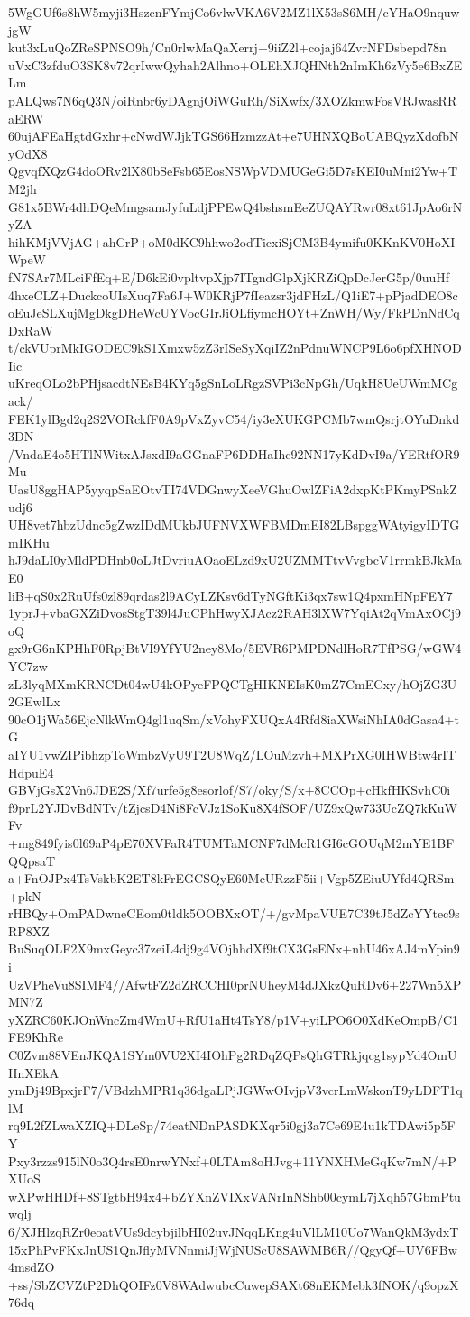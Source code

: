 5WgGUf6s8hW5myji3HszcnFYmjCo6vlwVKA6V2MZ1lX53sS6MH/cYHaO9nquwjgW
kut3xLuQoZReSPNSO9h/Cn0rlwMaQaXerrj+9iiZ2l+cojaj64ZvrNFDsbepd78n
uVxC3zfduO3SK8v72qrIwwQyhah2Alhno+OLEhXJQHNth2nImKh6zVy5e6BxZELm
pALQws7N6qQ3N/oiRnbr6yDAgnjOiWGuRh/SiXwfx/3XOZkmwFosVRJwasRRaERW
60ujAFEaHgtdGxhr+cNwdWJjkTGS66HzmzzAt+e7UHNXQBoUABQyzXdofbNyOdX8
QgvqfXQzG4doORv2lX80bSeFsb65EosNSWpVDMUGeGi5D7sKEI0uMni2Yw+TM2jh
G81x5BWr4dhDQeMmgsamJyfuLdjPPEwQ4bshsmEeZUQAYRwr08xt61JpAo6rNyZA
hihKMjVVjAG+ahCrP+oM0dKC9hhwo2odTicxiSjCM3B4ymifu0KKnKV0HoXIWpeW
fN7SAr7MLciFfEq+E/D6kEi0vpltvpXjp7ITgndGlpXjKRZiQpDcJerG5p/0uuHf
4hxeCLZ+DuckcoUIsXuq7Fa6J+W0KRjP7fIeazsr3jdFHzL/Q1iE7+pPjadDEO8c
oEuJeSLXujMgDkgDHeWcUYVocGIrJiOLfiymcHOYt+ZnWH/Wy/FkPDnNdCqDxRaW
t/ckVUprMkIGODEC9kS1Xmxw5zZ3rISeSyXqiIZ2nPdnuWNCP9L6o6pfXHNODIic
uKreqOLo2bPHjsacdtNEsB4KYq5gSnLoLRgzSVPi3cNpGh/UqkH8UeUWmMCgack/
FEK1ylBgd2q2S2VORckfF0A9pVxZyvC54/iy3eXUKGPCMb7wmQsrjtOYuDnkd3DN
/VndaE4o5HTlNWitxAJsxdI9aGGnaFP6DDHaIhc92NN17yKdDvI9a/YERtfOR9Mu
UasU8ggHAP5yyqpSaEOtvTI74VDGnwyXeeVGhuOwlZFiA2dxpKtPKmyPSnkZudj6
UH8vet7hbzUdnc5gZwzIDdMUkbJUFNVXWFBMDmEI82LBspggWAtyigyIDTGmIKHu
hJ9daLI0yMldPDHnb0oLJtDvriuAOaoELzd9xU2UZMMTtvVvgbcV1rrmkBJkMaE0
liB+qS0x2RuUfs0zl89qrdas2l9ACyLZKsv6dTyNGftKi3qx7sw1Q4pxmHNpFEY7
1yprJ+vbaGXZiDvosStgT39l4JuCPhHwyXJAcz2RAH3lXW7YqiAt2qVmAxOCj9oQ
gx9rG6nKPHhF0RpjBtVI9YfYU2ney8Mo/5EVR6PMPDNdlHoR7TfPSG/wGW4YC7zw
zL3lyqMXmKRNCDt04wU4kOPyeFPQCTgHIKNEIsK0mZ7CmECxy/hOjZG3U2GEwlLx
90cO1jWa56EjcNlkWmQ4gl1uqSm/xVohyFXUQxA4Rfd8iaXWsiNhIA0dGasa4+tG
aIYU1vwZIPibhzpToWmbzVyU9T2U8WqZ/LOuMzvh+MXPrXG0IHWBtw4rITHdpuE4
GBVjGsX2Vn6JDE2S/Xf7urfe5g8esorlof/S7/oky/S/x+8CCOp+cHkfHKSvhC0i
f9prL2YJDvBdNTv/tZjcsD4Ni8FcVJz1SoKu8X4fSOF/UZ9xQw733UcZQ7kKuWFv
+mg849fyis0l69aP4pE70XVFaR4TUMTaMCNF7dMcR1GI6cGOUqM2mYE1BFQQpsaT
a+FnOJPx4TsVskbK2ET8kFrEGCSQyE60McURzzF5ii+Vgp5ZEiuUYfd4QRSm+pkN
rHBQy+OmPADwneCEom0tldk5OOBXxOT/+/gvMpaVUE7C39tJ5dZcYYtec9sRP8XZ
BuSuqOLF2X9mxGeyc37zeiL4dj9g4VOjhhdXf9tCX3GsENx+nhU46xAJ4mYpin9i
UzVPheVu8SIMF4//AfwtFZ2dZRCCHI0prNUheyM4dJXkzQuRDv6+227Wn5XPMN7Z
yXZRC60KJOnWncZm4WmU+RfU1aHt4TsY8/p1V+yiLPO6O0XdKeOmpB/C1FE9KhRe
C0Zvm88VEnJKQA1SYm0VU2XI4IOhPg2RDqZQPsQhGTRkjqcg1sypYd4OmUHnXEkA
ymDj49BpxjrF7/VBdzhMPR1q36dgaLPjJGWwOIvjpV3vcrLmWskonT9yLDFT1qlM
rq9L2fZLwaXZIQ+DLeSp/74eatNDnPASDKXqr5i0gj3a7Ce69E4u1kTDAwi5p5FY
Pxy3rzzs915lN0o3Q4rsE0nrwYNxf+0LTAm8oHJvg+11YNXHMeGqKw7mN/+PXUoS
wXPwHHDf+8STgtbH94x4+bZYXnZVIXxVANrInNShb00cymL7jXqh57GbmPtuwqlj
6/XJHlzqRZr0eoatVUs9dcybjilbHI02uvJNqqLKng4uVlLM10Uo7WanQkM3ydxT
15xPhPvFKxJnUS1QnJflyMVNnmiJjWjNUScU8SAWMB6R//QgyQf+UV6FBw4msdZO
+ss/SbZCVZtP2DhQOIFz0V8WAdwubcCuwepSAXt68nEKMebk3fNOK/q9opzX76dq

